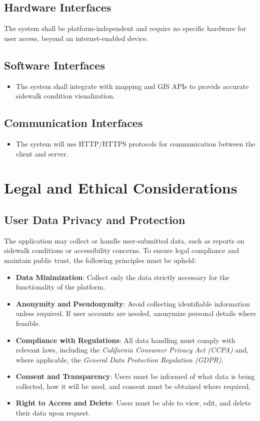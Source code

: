 \documentclass[a4paper,12pt]{article}
\begin{document}
\subsection{Hardware Interfaces}
The system shall be platform-independent and require no specific hardware for user access, beyond an internet-enabled device.

\subsection{Software Interfaces}
\begin{itemize}
    \item The system shall integrate with mapping and GIS APIs to provide accurate sidewalk condition visualization.
\end{itemize}

\subsection{Communication Interfaces}
\begin{itemize}
    \item The system will use HTTP/HTTPS protocols for communication between the client and server.
\end{itemize}

\newpage
\section{Legal and Ethical Considerations}

\subsection{User Data Privacy and Protection}
The application may collect or handle user-submitted data, such as reports on sidewalk conditions or accessibility concerns. To ensure legal compliance and maintain public trust, the following principles must be upheld:

\begin{itemize}
    \item \textbf{Data Minimization}: Collect only the data strictly necessary for the functionality of the platform.
    \item \textbf{Anonymity and Pseudonymity}: Avoid collecting identifiable information unless required. If user accounts are needed, anonymize personal details where feasible.
    \item \textbf{Compliance with Regulations}: All data handling must comply with relevant laws, including the \textit{California Consumer Privacy Act (CCPA)} and, where applicable, the \textit{General Data Protection Regulation (GDPR)}.
    \item \textbf{Consent and Transparency}: Users must be informed of what data is being collected, how it will be used, and consent must be obtained where required.
    \item \textbf{Right to Access and Delete}: Users must be able to view, edit, and delete their data upon request.
\end{itemize}
\end{document}
